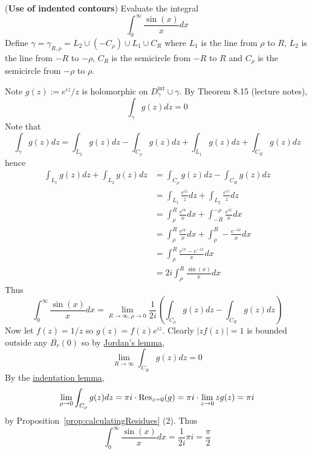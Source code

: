 \begin{example}
	(\textbf{Use of indented contours}) Evaluate the integral
	\[
		\int_{0}^{\infty} \frac{\sin(x)}{x} dx
	\]
	Define $\gamma = \gamma_{R, \rho} = L_2 \cup (-C_{\rho}) \cup L_1 \cup C_R$ where $L_1$ is the line from $\rho$ to $R$, $L_2$ is the line from $-R$ to $-\rho$, $C_R$ is the semicircle from $-R$ to $R$ and $C_{\rho}$ is the semicircle from $-\rho$ to $\rho$.

	Note $g(z) := e^{iz} / z$ is holomorphic on $D_{\gamma}^{\text{int}} \cup \gamma$. By Theorem 8.15 (lecture notes),
	\[
		\int_{\gamma} g(z) dz = 0
	\]
	Note that
	\[
		\int_{\gamma} g(z) dz = \int_{L_2} g(z) dz - \int_{C_{\rho}} g(z) dz + \int_{L_1} g(z) dz + \int_{C_R} g(z) dz
	\]
	hence
	\[
		\begin{aligned}
			\int_{L_1} g(z) dz + \int_{L_2} g(z) dz & = \int_{C_{\rho}} g(z) dz - \int_{C_R} g(z) dz \\
			& = \int_{L_1} \frac{e^{iz}}{z} dz + \int_{L_2} \frac{e^{iz}}{z} dz \\
			& = \int_{\rho}^{R} \frac{e^{ix}}{x} dx + \int_{-R}^{-\rho} \frac{e^{ix}}{x} dx \\
			& = \int_{\rho}^{R} \frac{e^{ix}}{x} dx + \int_{\rho}^{R} -\frac{e^{-ix}}{x} dx \\
			& = \int_{\rho}^{R} \frac{e^{ix} - e^{-ix}}{x} dx \\
			& = 2i \int_{\rho}^{R} \frac{\sin(x)}{x} dx
		\end{aligned}
	\]
	Thus
	\[
		\int_{0}^{\infty} \frac{\sin(x)}{x} dx = \lim_{R \to \infty, \rho \to 0} \frac{1}{2i} \left( \int_{C_{\rho}} g(z) dz - \int_{C_R} g(z) dz \right)
	\]
	Now let $f(z) = 1/z$ so $g(z) = f(z) e^{iz}$. Clearly $|z f(z)| = 1$ is bounded outside any $\overline{B_r}(0)$ so by \hyperref[lem:jordansLemma]{Jordan's lemma},
	\[
		\lim_{R \to \infty} \int_{C_R} g(z) dz = 0
	\]
	By the \hyperref[lem:indentationLemma]{indentation lemma},
	\[
		\lim_{\rho \to 0} \int_{C_{\rho}} g(z) dz = \pi i \cdot \text{Res}_{z = 0}(g) = \pi i \cdot \lim_{z \to 0} z g(z) = \pi i
	\]
	by Proposition~\ref{prop:calculatingResidues} (2). Thus
	\[
		\int_{0}^{\infty} \frac{\sin(x)}{x} dx = \frac{1}{2i} \pi i = \frac{\pi}{2}
	\]
\end{example}

